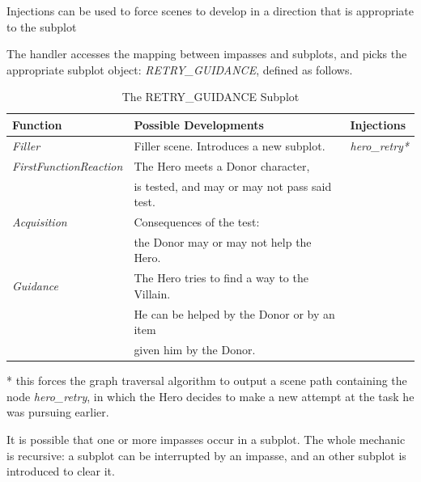 \documentclass[12pt,a4paper,oneside]{report}
\begin{document}
Injections can be used to force scenes to develop in a direction that is appropriate to the subplot

The handler accesses the mapping between impasses and subplots, and picks the appropriate subplot object: \textit{RETRY\_GUIDANCE}, defined as follows.

\bigskip

\begin{table}[H]
\caption{The RETRY\_GUIDANCE Subplot}
\label{tab:subplot}
\bigskip
\begin{tabular}{| l | l | l |}
\hline
Function & Possible Developments & Injections \\
\hline
\textit{Filler} & Filler scene. Introduces a new subplot. & \textit{hero\_retry*} \\
\hline
\textit{FirstFunctionReaction} & The Hero meets a Donor character, & \\
 & is tested, and may or may not pass said test. & \\
\hline
\textit{Acquisition} & Consequences of the test: & \\
 & the Donor may or may not help the Hero. & \\
\hline
\textit{Guidance} & The Hero tries to find a way to the Villain. &\\
 & He can be helped by the Donor or by an item&\\
 & given him by the Donor. &\\
\hline
\end{tabular}

\bigskip

* this forces the graph traversal algorithm to output a scene path containing the node \textit{hero\_retry}, in which the Hero decides to make a new attempt at the task he was pursuing earlier.
\end{table}

\bigskip

It is possible that one or more impasses occur in a subplot. The whole mechanic is recursive: a subplot can be interrupted by an impasse, and an other subplot is introduced to clear it.
\end{document}

